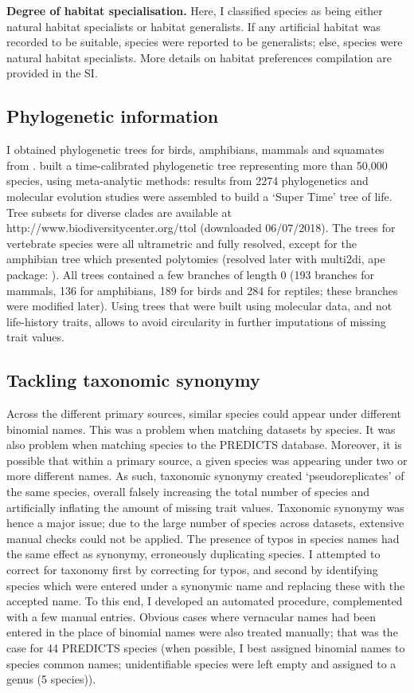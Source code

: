 \textbf{Degree of habitat specialisation.} Here, I classified species as being either natural habitat specialists or habitat generalists. If any artificial habitat was recorded to be suitable, species were reported to be generalists; else, species were natural habitat specialists. More details on habitat preferences compilation are provided in the SI. 

\subsection{Phylogenetic information}
I obtained phylogenetic trees for birds, amphibians, mammals and squamates from \citet{Hedges2015}. \citet{Hedges2015} built a time-calibrated phylogenetic tree representing more than 50,000 species, using meta-analytic methods: results from 2274 phylogenetics and molecular evolution studies were assembled to build a `Super Time' tree of life. Tree subsets for diverse clades are available at http://www.biodiversitycenter.org/ttol (downloaded 06/07/2018). The trees for vertebrate species were all ultrametric and fully resolved, except for the amphibian tree which presented polytomies (resolved later with multi2di, ape package: \citet{ape}). All trees contained a few branches of length 0 (193 branches for mammals, 136 for amphibians, 189 for birds and 284 for reptiles; these branches were modified later). Using trees that were built using molecular data, and not life-history traits, allows to avoid circularity in further imputations of missing trait values.


\subsection{Tackling taxonomic synonymy}
Across the different primary sources, similar species could appear under different binomial names. This was a problem when matching datasets by species. It was also problem when matching species to the PREDICTS database. Moreover, it is possible that within a primary source, a given species was appearing under two or more different names. As such, taxonomic synonymy created `pseudoreplicates' of the same species, overall falsely increasing the total number of species and artificially inflating the amount of missing trait values. Taxonomic synonymy was hence a major issue; due to the large number of species across datasets, extensive manual checks could not be applied. The presence of typos in species names had the same effect as synonymy, erroneously duplicating species. I attempted to correct for taxonomy first by correcting for typos, and second by identifying species which were entered under a synonymic name and replacing these with the accepted name. To this end, I developed an automated procedure, complemented with a few manual entries. Obvious cases where vernacular names had been entered in the place of binomial names were also treated manually; that was the case for 44 PREDICTS species (when possible, I best assigned binomial names to species common names; unidentifiable species were left empty and assigned to a genus (5 species)).

